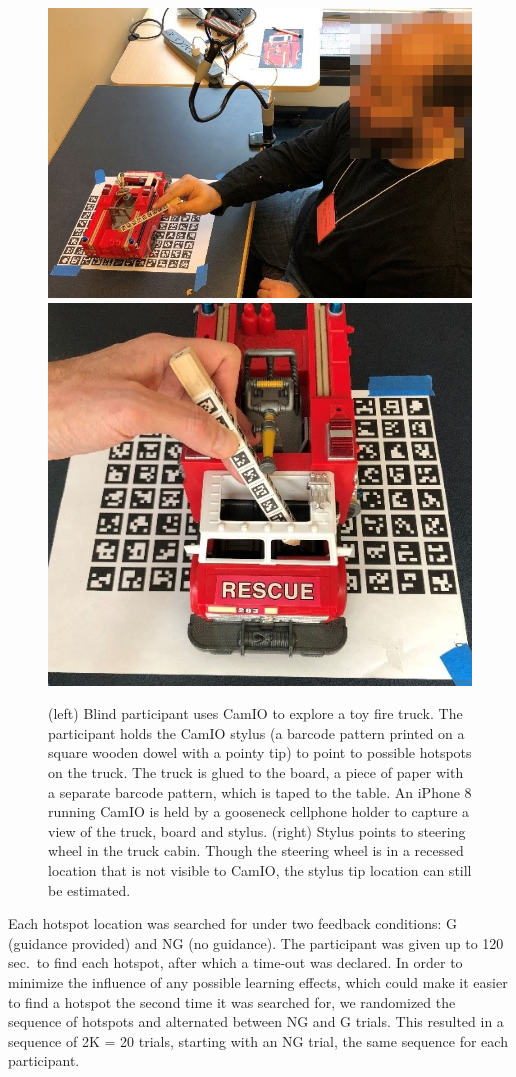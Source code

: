 \documentclass[runningheads]{res/templates/llncs}
\begin{document}
\begin{figure}
\includegraphics[width=0.55\linewidth]{res/img/fig1a}
\includegraphics[width=0.45\linewidth]{res/img/fig1b} 
\caption{(left) Blind participant uses CamIO to explore a toy fire truck. The participant holds the CamIO stylus (a barcode pattern printed on a square wooden dowel with a pointy tip) to point to possible hotspots on the truck. The truck is glued to the board, a piece of paper with a separate barcode pattern, which is taped to the table. An iPhone 8 running CamIO is held by a gooseneck cellphone holder to capture a view of the truck, board and stylus. (right) Stylus points to steering wheel in the truck cabin. Though the steering wheel is in a recessed location that is not visible to CamIO, the stylus tip location can still be estimated.}
\label{fig:exp}
\end{figure}

Each hotspot location was searched for under two feedback conditions: G
(guidance provided) and NG (no guidance). The participant was given up
to 120 sec.~to find each hotspot, after which a time-out was declared.
In order to minimize the influence of any possible learning effects,
which could make it easier to find a hotspot the second time it was
searched for, we randomized the sequence of hotspots and alternated
between NG and G trials. This resulted in a sequence of 2K = 20 trials,
starting with an NG trial, the same sequence for each participant.
\end{document}
